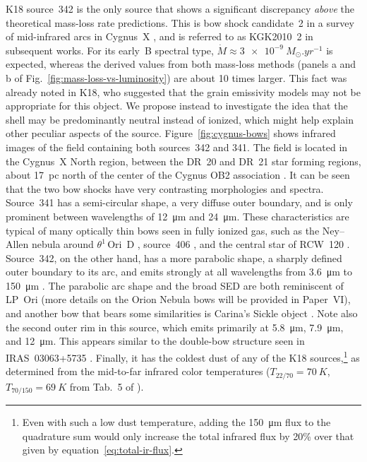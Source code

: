 \documentclass[useAMS, usenatbib, a4paper]{mnras}
\newcommand{\thD}{\(\theta^1\)\,Ori~D}
\begin{document}
K18 source~342 is the only source that shows a significant discrepancy
\textit{above} the theoretical mass-loss rate predictions.  This is
bow shock candidate~2 in a survey of mid-infrared arcs in Cygnus~X
\citep{Kobulnicky:2010a}, and is referred to as KGK2010~2 in
subsequent works.  For its early~B spectral type,
\(\dot{M} \approx \SI{3e-9}{M_\odot.yr^{-1}}\) is expected, whereas the derived
values from both mass-loss methods (panels a and b of
Fig.~\ref{fig:mass-loss-vs-luminosity}) are about 10 times larger.
This fact was already noted in K18, who suggested that the grain
emissivity models may not be appropriate for this object.  We propose
instead to investigate the idea that the shell may be predominantly
neutral instead of ionized, which might help explain other peculiar
aspects of the source.  Figure~\ref{fig:cygnus-bows} shows infrared
images of the field containing both sources~342 and 341.  The field is
located in the Cygnus~X North region, between the DR~20 and DR~21 star
forming regions, about \SI{17}{pc} north of the center of the Cygnus
OB2 association \citep[e.g.,][]{Schneider:2016a}.  It can be seen that
the two bow shocks have very contrasting morphologies and spectra.
Source~341 has a semi-circular shape, a very diffuse outer boundary,
and is only prominent between wavelengths of \SI{12}{\um} and
\SI{24}{\um}.  These characteristics are typical of many optically
thin bows seen in fully ionized gas, such as the Ney--Allen nebula
around \thD{} \citetext{compare the bow shape in Fig.~3a of
  \citealp{Smith:2005a}}, source~406 \citetext{HD~92607, which is
  ERO~36 in Carina, \citealp{Sexton:2015b}}, and the central star of
RCW~120 \citetext{not included in current samples, but see
  \citealp{Mackey:2015a, Mackey:2016a}}.  Source~342, on the other
hand, has a more parabolic shape, a sharply defined outer boundary to
its arc, and emits strongly at all wavelengths from \SI{3.6}{\um} to
\SI{150}{\um} \citetext{see also Fig.~13 of
  \citealp{Kobulnicky:2010a}}.  The parabolic arc shape and the broad
SED are both reminiscent of LP~Ori (more details on the Orion Nebula
bows will be provided in Paper~VI), and another bow that bears some
similarities is Carina's Sickle object \citetext{ERO~21
  \citealp{Sexton:2015b}, see also \citealp{Ngoumou:2013a} and \S~4 of
  \citealp{Hartigan:2015a}}.  Note also the second outer rim in this
source, which emits primarily at \SI{5.8}{\um}, \SI{7.9}{\um}, and
\SI{12}{\um}. This appears similar to the double-bow structure seen in
IRAS~03063+5735 \citep{Kobulnicky:2012a}.  Finally, it has the coldest
dust of any of the K18 sources,\footnote{%
  Even with such a low dust temperature, adding the \SI{150}{\um} flux
  to the quadrature sum would only increase the total infrared flux by
  20\% over that given by equation~\eqref{eq:total-ir-flux}.} %
as determined from the mid-to-far infrared color temperatures
(\(T_{22/70} = \SI{70}{K}\), \(T_{70/150} = \SI{69}{K}\) from Tab.~5
of \citealp{Kobulnicky:2017a}).
\end{document}
